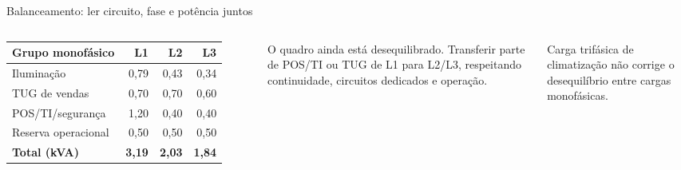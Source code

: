 \begin{frame}{Balanceamento: ler circuito, fase e potência juntos}
\small
\begin{columns}[T,onlytextwidth]
\begin{tabular}{l r r r}
\toprule
Grupo monofásico & L1 & L2 & L3 \\
\midrule
Iluminação & 0,79 & 0,43 & 0,34 \\
TUG de vendas & 0,70 & 0,70 & 0,60 \\
POS/TI/segurança & 1,20 & 0,40 & 0,40 \\
Reserva operacional & 0,50 & 0,50 & 0,50 \\
\midrule
\textbf{Total (kVA)} & \textbf{3,19} & \textbf{2,03} & \textbf{1,84} \\
\bottomrule
\end{tabular}
\begin{caixaAt}[title=Leitura crítica]
O quadro ainda está desequilibrado. Transferir parte de POS/TI ou TUG de L1 para L2/L3, respeitando continuidade, circuitos dedicados e operação.
\end{caixaAt}
\begin{caixaObs}
Carga trifásica de climatização não corrige o desequilíbrio entre cargas monofásicas.
\end{caixaObs}
\end{columns}
\end{frame}

